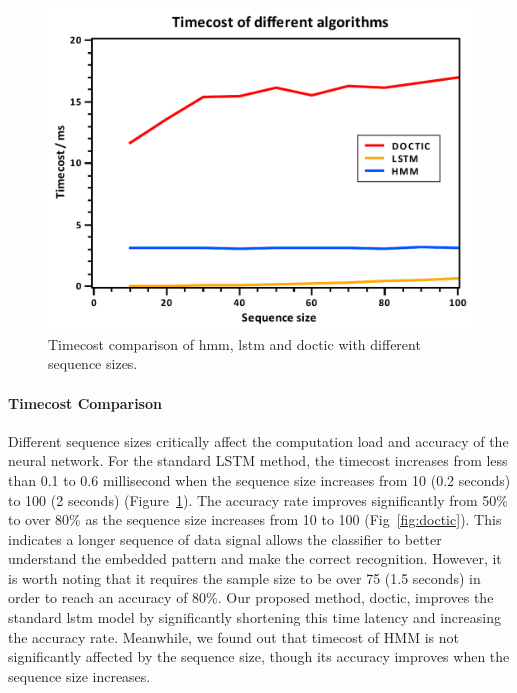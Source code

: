 \documentclass[review]{vgtc}                 %
\begin{document}
\begin{figure}[!htp]
	\centering
	\includegraphics[width=\linewidth]{figs/timecost.pdf}
	\caption{Timecost comparison of \acs{hmm}, \acs{lstm} and \acs{doctic} with different sequence sizes.}
	\label{fig:timecost}
\end{figure}



\paragraph{Timecost Comparison}
Different sequence sizes critically affect the computation load and accuracy of the neural network.
For the standard LSTM method, the timecost increases from less than 0.1 to 0.6 millisecond when the sequence size increases from 10 (0.2 seconds) to 100 (2 seconds) (Figure~\ref{fig:timecost}).
The accuracy rate improves significantly from 50\% to over 80\% as the sequence size increases from 10 to 100 (Fig~\ref{fig:doctic}).
This indicates a longer sequence of data signal allows the classifier to better understand the embedded pattern and make the correct recognition.
However, it is worth noting that it requires the sample size to be over 75 (1.5 seconds) in order to reach an accuracy of 80\%.
Our proposed method, \acs{doctic}, improves the standard \acs{lstm} model by significantly shortening this time latency and increasing the accuracy rate.
Meanwhile, we found out that timecost of HMM is not significantly affected by the sequence size, though its accuracy improves when the sequence size increases.
\end{document}
